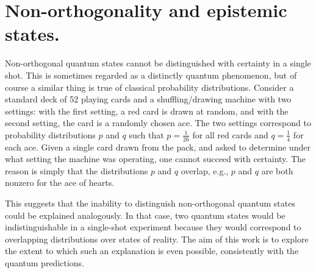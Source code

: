 \section*{Non-orthogonality and epistemic states.}
Non-orthogonal quantum states cannot be distinguished with certainty in a single shot. This is sometimes regarded as a distinctly quantum phenomenon, but of course a similar thing is true of classical probability distributions. Consider a standard deck of 52 playing cards and a shuffling/drawing machine with two settings: with the first setting, a red card is drawn at random, and with the second setting, the card is a randomly chosen ace. The two settings correspond to probability distributions $p$ and $q$ such that $p=\frac{1}{26}$ for all red cards and $q=\frac{1}{4}$ for each ace. Given a single card drawn from the pack, and asked to determine under what setting the machine was operating, one cannot succeed with certainty. The reason is simply that the distributions $p$ and $q$ overlap, e.g., $p$ and $q$ are both nonzero for the ace of hearts. 


This suggests that the inability to distinguish non-orthogonal quantum states could be explained analogously. In that case, two quantum states would be indistinguishable in a single-shot experiment because they would correspond to overlapping distributions over states of reality. The aim of this work is to explore the extent to which such an explanation is even possible, consistently with the quantum predictions.

